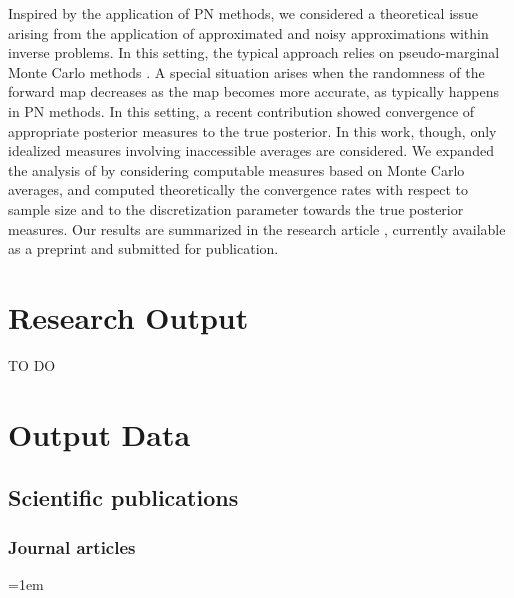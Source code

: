 \documentclass[10pt]{article}
\begin{document}
Inspired by the application of PN methods, we considered a theoretical issue arising from the application of approximated and noisy approximations within inverse problems. In this setting, the typical approach relies on pseudo-marginal Monte Carlo methods \cite{AnR09}. A special situation arises when the randomness of the forward map decreases as the map becomes more accurate, as typically happens in PN methods. In this setting, a recent contribution \cite{LST18} showed convergence of appropriate posterior measures to the true posterior. In this work, though, only idealized measures involving inaccessible averages are considered. We expanded the analysis of \cite{LST18} by considering computable measures based on Monte Carlo averages, and computed theoretically the convergence rates with respect to sample size and to the discretization parameter towards the true posterior measures. Our results are summarized in the research article \cite{Gar21b}, currently available as a preprint and submitted for publication.

\section{Research Output}
{\color{red} TO DO}




\clearpage
\section{Output Data}

\subsection{Scientific publications}

\subsubsection*{Journal articles}

\sloppy
\emergencystretch=1em
\begin{enumerate}[label={[\arabic*]}]
	\item {}
	\item {}
	\item {}
	\item {}
	\item {}
	\item {}
	\item {}
	\item {}
	\item {}
	\item {}
	\item {}
	\item {}
\end{enumerate}
\end{document}
